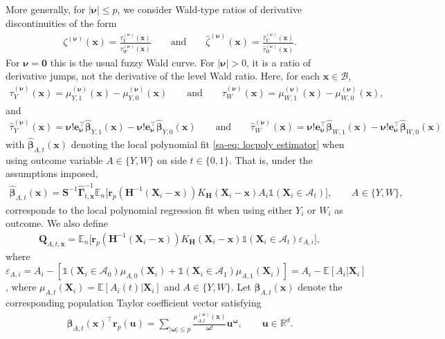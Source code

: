 \documentclass[10pt]{article}
\newcommand{\E}{\mathbb{E}}
\newcommand{\Indicator}{\mathds{1}}
\newcommand{\En}{\mathbb{E}_n}
\newcommand{\reals}{\mathbb{R}}
\newcommand{\be}{\mathbf{e}}
\newcommand{\bH}{\mathbf{H}}
\newcommand{\bQ}{\mathbf{Q}}
\newcommand{\br}{\mathbf{r}}
\newcommand{\bS}{\mathbf{S}}
\newcommand{\bu}{\mathbf{u}}
\newcommand{\bx}{\mathbf{x}}
\newcommand{\bX}{\mathbf{X}}
\newcommand{\bbeta}{\boldsymbol{\beta}}
\newcommand{\bnu}{\boldsymbol{\nu}}
\newcommand{\bomega}{\boldsymbol{\omega}}
\newcommand{\bGamma}{\boldsymbol{\Gamma}}
\newcommand{\A}{\mathcal{A}}
\newcommand{\B}{\mathcal{B}}
\begin{document}
More generally, for $|\bnu|\leq p$, we consider Wald-type ratios of derivative discontinuities of the form
\begin{align*}
    \zeta^{(\bnu)}(\bx) = \frac{\tau^{(\bnu)}_{Y}(\bx)}{\tau^{(\bnu)}_{W}(\bx)}
    \qquad\text{and}\qquad
    \widehat{\zeta}^{(\bnu)}(\bx) = \frac{\widehat{\tau}^{(\bnu)}_{Y}(\bx)}{\widehat{\tau}^{(\bnu)}_{W}(\bx)}.
\end{align*}
For $\bnu=\mathbf{0}$ this is the usual fuzzy Wald curve. For $|\bnu|>0$, it is a ratio of derivative jumps, not the derivative of the level Wald ratio. Here, for each $\bx \in \B$,
\begin{align*}
    \tau^{(\bnu)}_{Y}(\bx) = \mu^{(\bnu)}_{Y,1}(\bx) - \mu^{(\bnu)}_{Y,0}(\bx)
    \qquad\text{and}\qquad
    \tau^{(\bnu)}_{W}(\bx) = \mu^{(\bnu)}_{W,1}(\bx) - \mu^{(\bnu)}_{W,0}(\bx),
\end{align*}
and
\begin{align*}
    \widehat{\tau}^{(\bnu)}_{Y}(\bx)
    = \bnu!\be_{\bnu}^{\top}\widehat{\bbeta}_{Y,1}(\bx) - \bnu!\be_{\bnu}^{\top}\widehat{\bbeta}_{Y,0}(\bx)
    \qquad\text{and}\qquad
    \widehat{\tau}_{W}^{(\bnu)}(\bx)
    = \bnu!\be_{\bnu}^{\top}\widehat{\bbeta}_{W,1}(\bx) - \bnu!\be_{\bnu}^{\top}\widehat{\bbeta}_{W,0}(\bx)
\end{align*}
with $\widehat{\bbeta}_{A,t}(\bx)$ denoting the local polynomial fit \eqref{sa-eq: locpoly estimator} when using outcome variable $A \in \{Y,W\}$ on side $t\in\{0,1\}$. That is, under the assumptions imposed,
\begin{align*}
    \widehat{\bbeta}_{A,t}(\bx)
     = \bS^{-1} \widehat{\bGamma}_{t,\bx}^{-1} \En \big[\br_p(\bH^{-1}(\bX_i-\bx)) K_{\bH}(\bX_i - \bx) A_i \Indicator(\bX_i \in \A_t) \big],
    \qquad A\in\{Y,W\},
\end{align*}
corresponds to the local polynomial regression fit when using either $Y_i$ or $W_i$ as outcome. We also define
\begin{align*}
    \bQ_{A,t,\bx} = \En \big[\br_p(\bH^{-1}(\bX_i - \bx)) K_{\bH}(\bX_i - \bx) \Indicator(\bX_i \in \A_t) \varepsilon_{A,i}\big],
\end{align*}
where $\varepsilon_{A,i} = A_i - [\Indicator(\bX_i \in \A_0) \mu_{A,0}(\bX_i) + \Indicator(\bX_i \in \A_1) \mu_{A,1}(\bX_i)] = A_i - \E[A_i|\bX_i]$, where $\mu_{A,t}(\bX_i) = \E[A_i(t)|\bX_i]$ and $A\in\{Y,W\}$. Let $\bbeta_{A,t}(\bx)$ denote the corresponding population Taylor coefficient vector satisfying
\begin{align*}
    \bbeta_{A,t}(\bx)^\top\br_p(\bu)
    = \sum_{|\bomega|\leq p}\frac{\mu_{A,t}^{(\bomega)}(\bx)}{\bomega!}\bu^{\bomega},
    \qquad \bu\in\reals^d.
\end{align*}
\end{document}
